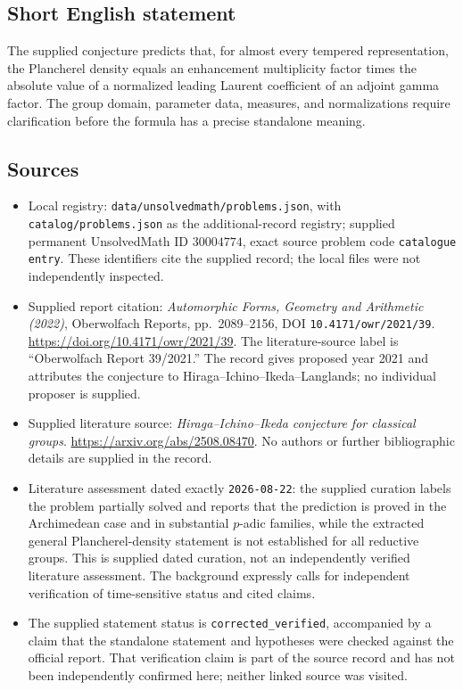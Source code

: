 \documentclass[11pt]{article}
\begin{document}
\subsection{Short English statement}
The supplied conjecture predicts that, for almost every tempered representation, the Plancherel density equals an enhancement multiplicity factor times the absolute value of a normalized leading Laurent coefficient of an adjoint gamma factor. The group domain, parameter data, measures, and normalizations require clarification before the formula has a precise standalone meaning.
\subsection{Sources}
\begin{itemize}
\item Local registry: \texttt{data/unsolvedmath/problems.json}, with \texttt{catalog/problems.json} as the additional-record registry; supplied permanent UnsolvedMath ID \(30004774\), exact source problem code \texttt{catalogue entry}. These identifiers cite the supplied record; the local files were not independently inspected.
\item Supplied report citation: \emph{Automorphic Forms, Geometry and Arithmetic (2022)}, Oberwolfach Reports, pp.~2089--2156, DOI \texttt{10.4171/owr/2021/39}. \url{https://doi.org/10.4171/owr/2021/39}. The literature-source label is ``Oberwolfach Report 39/2021.'' The record gives proposed year 2021 and attributes the conjecture to Hiraga--Ichino--Ikeda--Langlands; no individual proposer is supplied.
\item Supplied literature source: \emph{Hiraga--Ichino--Ikeda conjecture for classical groups}. \url{https://arxiv.org/abs/2508.08470}. No authors or further bibliographic details are supplied in the record.
\item Literature assessment dated exactly \texttt{2026-08-22}: the supplied curation labels the problem partially solved and reports that the prediction is proved in the Archimedean case and in substantial \(p\)-adic families, while the extracted general Plancherel-density statement is not established for all reductive groups. This is supplied dated curation, not an independently verified literature assessment. The background expressly calls for independent verification of time-sensitive status and cited claims.
\item The supplied statement status is \texttt{corrected\_verified}, accompanied by a claim that the standalone statement and hypotheses were checked against the official report. That verification claim is part of the source record and has not been independently confirmed here; neither linked source was visited.
\end{itemize}
\end{document}
